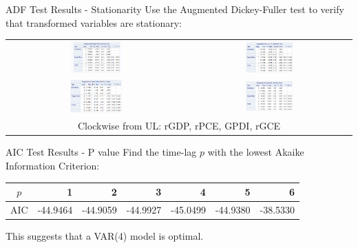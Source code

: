 \begin{frame}{ADF Test Results - Stationarity}
    Use the Augmented Dickey-Fuller test to verify that transformed
    variables are stationary:
    \begin{center}
    \begin{tabular}{cc}
        \includegraphics[width=0.30\textwidth]{../img/rgdp-fdlog-ADFtest.png} &
        \includegraphics[width=0.30\textwidth]{../img/rpce-fdlog-ADFtest.png} \\
        \includegraphics[width=0.30\textwidth]{../img/rgce-fdlog-ADFtest.png} &
        \includegraphics[width=0.30\textwidth]{../img/gpdi-fdlog-ADFtest.png} \\
        \multicolumn{2}{c}{\tiny \centering Clockwise from UL: rGDP, rPCE, GPDI, rGCE }
    \end{tabular}
    \end{center}
\end{frame}

\begin{frame}{AIC Test Results - P value}  
    Find the time-lag $p$ with the lowest Akaike Information Criterion:
    \begin{center}
    \begin{tabular}{|c|r|r|r|r|r|r|}
        \hline $p$ & 1 & 2 & 3 & \cellcolor{gray}\color{blue}4 & 5 & 6 \\
        \hline AIC & -44.9464 & -44.9059 & -44.9927 & \cellcolor{gray}\color{blue}-45.0499 & -44.9380 & -38.5330 \\
        \hline
    \end{tabular}
    \end{center}
    
    This suggests that a VAR(4) model is optimal.
\end{frame}


